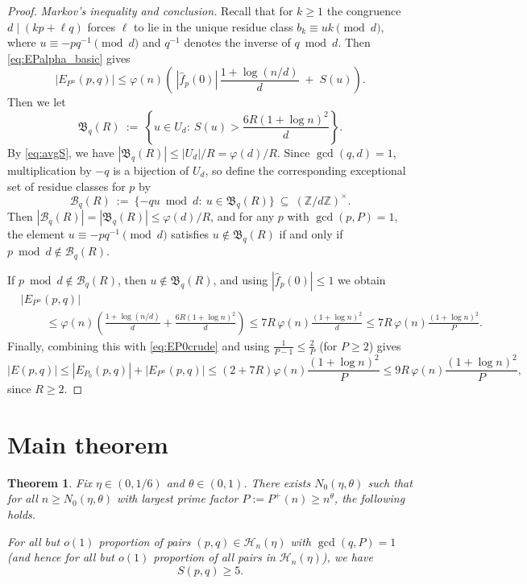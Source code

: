\documentclass[12pt]{amsart}
\newtheorem{theorem}{Theorem}[section]
\begin{document}
\begin{proof}
\smallskip
\noindent
\emph{Markov's inequality and conclusion.}
Recall that for $k\ge 1$ the congruence $d\mid (kp+\ell q)$ forces $\ell$ to lie in the unique residue class
$b_k\equiv uk\pmod d$, where $u\equiv -pq^{-1}\pmod d$ and $q^{-1}$ denotes the inverse of $q\bmod d$.
Then \eqref{eq:EPalpha_basic} gives
\[
|E_{P^\alpha}(p,q)|\le \varphi(n)\left(\ |\widehat f_p(0)|\,\frac{1+\log(n/d)}{d}\;+\;S(u)\right).
\]
Then we let
\[
\mathfrak{B}_q(R)\ :=\ \left\{u\in U_d:\ S(u)>\frac{6R(1+\log n)^2}{d}\right\}.
\]
By \eqref{eq:avgS}, we have $|\mathfrak{B}_q(R)|\le |U_d|/R=\varphi(d)/R$.
Since $\gcd(q,d)=1$, multiplication by $-q$ is a bijection of $U_d$, so define the corresponding
exceptional set of residue classes for $p$ by
\[
\mathcal{B}_q(R)\ :=\ \{-qu \bmod d:\ u\in \mathfrak{B}_q(R)\}\ \subseteq\ (\mathbb{Z}/d\mathbb{Z})^\times.
\]
Then $|\mathcal{B}_q(R)|=|\mathfrak{B}_q(R)|\le \varphi(d)/R$, and for any $p$ with $\gcd(p,P)=1$,
the element $u\equiv -pq^{-1}\pmod d$ satisfies $u\notin \mathfrak{B}_q(R)$ if and only if
$p\bmod d\notin \mathcal{B}_q(R)$.

If $p\bmod d\notin \mathcal{B}_q(R)$, then $u\notin \mathfrak{B}_q(R)$, and using $|\widehat f_p(0)|\le 1$ we obtain
\begin{displaymath}
\begin{split}
&|E_{P^\alpha}(p,q)|\\
&\ \ \ \ \ \ \ \ \ \ \le \varphi(n)\left(\frac{1+\log(n/d)}{d}+\frac{6R(1+\log n)^2}{d}\right)
\le 7R\,\varphi(n)\frac{(1+\log n)^2}{d}
\le 7R\,\varphi(n)\frac{(1+\log n)^2}{P}.
\end{split}
\end{displaymath}
Finally, combining this with \eqref{eq:EP0crude} and using $\frac{1}{P-1}\le \frac{2}{P}$ (for $P\ge 2$) gives
\[
|E(p,q)|\le |E_{P_0}(p,q)|+|E_{P^\alpha}(p,q)|
\le \left(2+7R\right)\varphi(n)\frac{(1+\log n)^2}{P}
\le 9R\,\varphi(n)\frac{(1+\log n)^2}{P},
\]
since $R\ge 2$.
\end{proof}

\section{Main theorem}\label{Section6}

\begin{theorem}\label{thm:main}
Fix $\eta\in(0,1/6)$ and $\theta\in(0,1)$.
There exists $N_0(\eta,\theta)$ such that for all $n\ge N_0(\eta,\theta)$ with largest prime factor
$P:=P^+(n)\ge n^\theta$, the following holds.

\smallskip\noindent
For all but $o(1)$ proportion of pairs $(p,q)\in\mathcal{H}_n(\eta)$ with $\gcd(q,P)=1$
(and hence for all but $o(1)$ proportion of all pairs in $\mathcal{H}_n(\eta)$),
we have
\[
S(p,q)\ge 5.
\]
\end{theorem}
\end{document}
